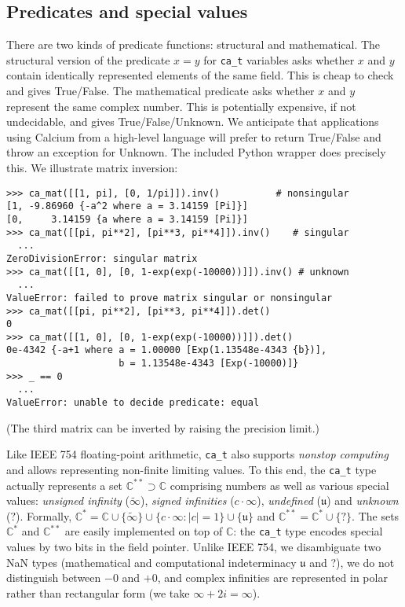 \documentclass[sigconf,screen,urlbreakonhyphens]{acmart}
\begin{document}
\subsection{Predicates and special values}

There are two kinds of predicate functions: structural
and mathematical. The structural version
of the predicate $x = y$ for \texttt{ca\_t} variables
asks whether $x$ and $y$ contain identically
represented elements
of the same field. This is cheap to check and
gives True/False.
The mathematical predicate asks whether $x$ and $y$ represent
the same complex number.
This is potentially expensive, if not undecidable, and gives True/False/Unknown.
We anticipate that applications using Calcium from a high-level
language will prefer to return True/False and throw an exception for Unknown.
The included Python wrapper does precisely this.
We illustrate matrix inversion:

\begin{small}
\begin{verbatim}
>>> ca_mat([[1, pi], [0, 1/pi]]).inv()          # nonsingular
[1, -9.86960 {-a^2 where a = 3.14159 [Pi]}]
[0,     3.14159 {a where a = 3.14159 [Pi]}]
>>> ca_mat([[pi, pi**2], [pi**3, pi**4]]).inv()    # singular
  ...
ZeroDivisionError: singular matrix
>>> ca_mat([[1, 0], [0, 1-exp(exp(-10000))]]).inv() # unknown
  ...
ValueError: failed to prove matrix singular or nonsingular
>>> ca_mat([[pi, pi**2], [pi**3, pi**4]]).det()
0
>>> ca_mat([[1, 0], [0, 1-exp(exp(-10000))]]).det()
0e-4342 {-a+1 where a = 1.00000 [Exp(1.13548e-4343 {b})],
                    b = 1.13548e-4343 [Exp(-10000)]}
>>> _ == 0
  ...
ValueError: unable to decide predicate: equal
\end{verbatim}
\end{small}

(The third matrix can be inverted by raising the precision limit.)

Like IEEE 754 floating-point arithmetic, 
\texttt{ca\_t} also supports \emph{nonstop computing}
and allows representing non-finite limiting values.
To this end, the \texttt{ca\_t} type actually represents a set $\mathbb{C}^{**} \supset \mathbb{C}$
comprising numbers as well as
various special values:
\emph{unsigned infinity} ($\tilde \infty$),
\emph{signed infinities} ($c \cdot \infty$),
\emph{undefined} ($\mathfrak{u}$)
and \emph{unknown} ($?$).
Formally, $\mathbb{C}^{*} = \mathbb{C} \cup \{\tilde \infty \}
\cup \{c \cdot \infty : |c| = 1\} \cup \{ \mathfrak{u} \}$ and
$\mathbb{C}^{**} = \mathbb{C}^{*} \cup \{ ? \}$.
The sets $\mathbb{C}^{*}$ and $\mathbb{C}^{**}$ are
easily implemented on top of $\mathbb{C}$:
the \texttt{ca\_t} type encodes
special values by two bits in the field pointer.
Unlike IEEE 754,
we disambiguate two NaN types
(mathematical and computational indeterminacy $\mathfrak{u}$ and ?),
we do not distinguish between $-0$ and $+0$,
and complex infinities are represented in polar rather than rectangular form
(we take $\infty + 2i = \infty$).
\end{document}
